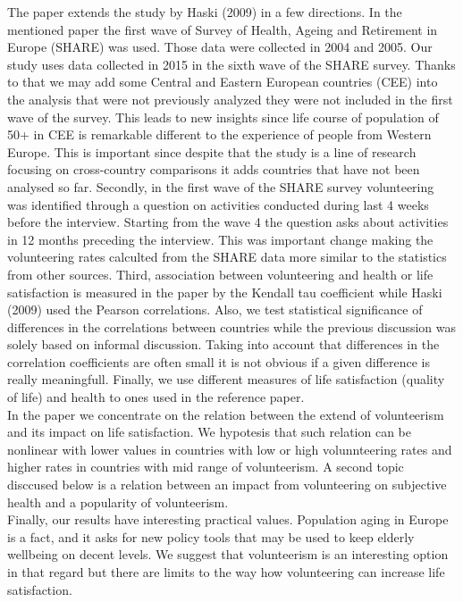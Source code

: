 \documentclass[10pt, letterpaper]{article}
\begin{document}
\begin{spacing}{1.4}
The paper extends the study by Haski (2009) in a few directions. In the mentioned paper the first wave of Survey of Health, Ageing and Retirement in Europe (SHARE) was used. Those data were collected in 2004 and 2005. Our study uses data collected in 2015 in the sixth wave of the SHARE survey. Thanks to that we may add some  Central and Eastern European countries (CEE) into the analysis that were not previously  analyzed they were not included in the first wave of the survey. This  leads to new insights since life course of population of 50+ in CEE is remarkable different to the experience of people from Western Europe. This is important since despite that the study is a line of research focusing on cross-country comparisons it adds countries that have not been analysed so far. Secondly, in the first wave of the SHARE survey volunteering was identified through a question on activities conducted during last 4 weeks before the interview. Starting from the wave 4 the question asks about activities in 12 months preceding the interview. This was important change making the volunteering rates calculted from the SHARE data more similar to the statistics from other sources.  Third, association between volunteering and health or life satisfaction is measured in the paper by the Kendall tau coefficient while Haski (2009) used the Pearson correlations. Also, we test statistical significance of differences in the correlations between countries while the previous discussion was solely based on informal discussion.  Taking into account that differences in the correlation coefficients are often small it is not obvious if a given difference is really meaningfull. Finally, we use different measures of life satisfaction (quality of life) and health to ones used in the reference paper.  \\

In the paper we concentrate on the relation between the extend of volunteerism and its impact on life satisfaction. We hypotesis that such relation can be nonlinear with lower values in countries with low or high volunnteering rates and higher rates in countries with mid range of volunteerism. A second topic disccused below is a relation between an impact from volunteering on subjective health and a popularity of volunteerism. \\


Finally, our results have interesting practical values. Population aging in Europe is a fact, and it asks for new policy tools that may be used to keep elderly wellbeing on decent levels. We suggest that volunteerism is an interesting option in that regard but there are limits to the way how volunteering can increase life satisfaction.  
 

\end{spacing}
\end{document}

